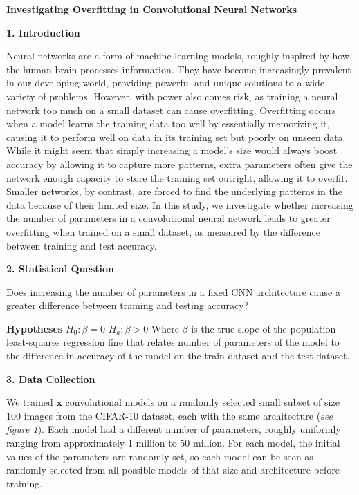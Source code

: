 \documentclass[12pt]{article}
\begin{document}
    \centerline{\textbf{Investigating Overfitting in Convolutional Neural Networks}}

    \noindent\textbf{1. Introduction}

    Neural networks are a form of machine learning models, roughly inspired by how the human brain
    processes information. They have become increasingly prevalent in our developing world, providing
    powerful and unique solutions to a wide variety of problems. However, with power also comes risk,
    as training a neural network too much on a small dataset can cause overfitting. Overfitting occurs
    when a model learns the training data too well by essentially memorizing it, causing it to perform
    well on data in its training set but poorly on unseen data. While it might seem that simply
    increasing a model’s size would always boost accuracy by allowing it to capture more patterns,
    extra parameters often give the network enough capacity to store the training set outright, allowing
    it to overfit. Smaller networks, by contrast, are forced to find the underlying patterns in the data
    because of their limited size. In this study, we investigate whether increasing the number of parameters
    in a convolutional neural network leads to greater overfitting when trained on a small dataset, as
    measured by the difference between training and test accuracy.

    \noindent\textbf{2. Statistical Question}

    Does increasing the number of parameters in a fixed CNN architecture cause a greater difference
    between training and testing accuracy?

    \noindent\textbf{Hypotheses}\newline
    $H_0: \beta = 0$ \newline
    $H_a: \beta > 0$ \newline\newline
    Where $\beta$ is the true slope of the population least‐squares regression line that relates number
    of parameters of the model to the difference in accuracy of the model on the train dataset and the
    test dataset.

    \noindent\textbf{3. Data Collection}

    We trained $\mathbf{x}$ convolutional models on a randomly selected small subset of size 100 images
    from the CIFAR-10 dataset, each with the same architecture (\textit{see figure 1}). Each model had
    a different number of parameters, roughly uniformly ranging from approximately 1 million to 50 million.
    For each model, the initial values of the parameters are randomly set, so each model can be seen as randomly
    selected from all possible models of that size and architecture before training.
\end{document}
